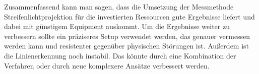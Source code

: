 \documentclass[ngerman,a4paper,parskip=half]{scrartcl}
\begin{document}
Zusammenfassend kann man sagen, dass die Umsetzung der Messmethode Streifenlichtprojektion für die investierten Ressourcen gute Ergebnisse liefert und dabei mit günstigem Equipment auskommt.
Um die Ergebnisse weiter zu verbessern sollte ein präziseres Setup verwendet werden, das genauer vermessen werden kann und resistenter gegenüber physischen Störungen ist. Außerdem ist die Linienerkennung noch instabil. Das könnte durch eine Kombination der Verfahren oder durch neue komplexere Ansätze verbessert werden.


\newpage





\nocite{Haeming10sfm}
\nocite{Tomasi98stereomatching}
\nocite{manfred81math}
\nocite{opencv}
\nocite{particle}


\renewcommand*{\refname}{Quellenverzeichnis}
\let\Oldsection\section
\renewcommand*{\section}[2]{\Oldsection{#2}}



\end{document}

